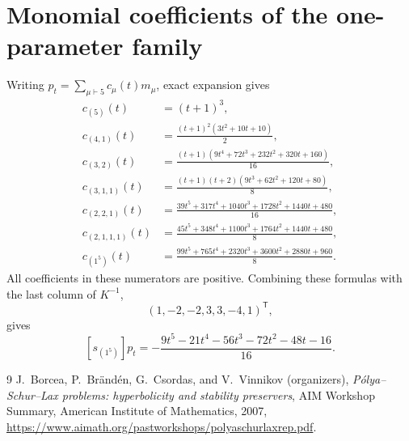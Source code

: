\documentclass[11pt]{article}
\theoremstyle{remark}
\newcommand{\partn}{\vdash}
\begin{document}
\appendix
\section{Monomial coefficients of the one-parameter family}
\label{app:family}

Writing $p_t=\sum_{\mu\partn5}c_\mu(t)m_\mu$, exact expansion gives
\begin{align*}
c_{(5)}(t)&=(t+1)^3,\\
c_{(4,1)}(t)&=\frac{(t+1)^2(3t^2+10t+10)}2,\\
c_{(3,2)}(t)&=\frac{(t+1)(9t^4+72t^3+232t^2+320t+160)}{16},\\
c_{(3,1,1)}(t)&=\frac{(t+1)(t+2)(9t^3+62t^2+120t+80)}8,\\
c_{(2,2,1)}(t)&=\frac{39t^5+317t^4+1040t^3+1728t^2+1440t+480}{16},\\
c_{(2,1,1,1)}(t)&=\frac{45t^5+348t^4+1100t^3+1764t^2+1440t+480}{8},\\
c_{(1^5)}(t)&=\frac{99t^5+765t^4+2320t^3+3600t^2+2880t+960}{8}.
\end{align*}
All coefficients in these numerators are positive.  Combining these formulas
with the last column of $K^{-1}$,
\[
(1,-2,-2,3,3,-4,1)^{\mathsf T},
\]
gives
\[
[s_{(1^5)}]p_t
=-\frac{9t^5-21t^4-56t^3-72t^2-48t-16}{16}.
\]

\begin{thebibliography}{9}
J.~Borcea, P.~Br\"and\'en, G.~Csordas, and V.~Vinnikov (organizers),
\emph{P\'olya--Schur--Lax problems: hyperbolicity and stability preservers},
AIM Workshop Summary, American Institute of Mathematics, 2007,
\url{https://www.aimath.org/pastworkshops/polyaschurlaxrep.pdf}.
\end{thebibliography}
\end{document}
